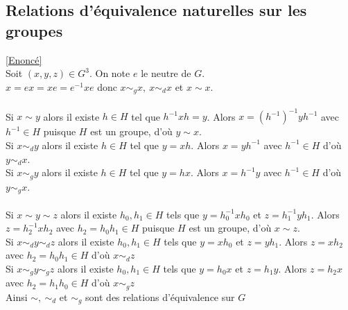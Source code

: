 \documentclass[8pt]{book}
\begin{document}
	\subsection{Relations d'équivalence naturelles sur les groupes }
	\label{Relations d'équivalence naturelles sur les groupes corrigé}
	\textcolor{blue}{\hyperref[Relations d'équivalence naturelles sur les groupes]{[Enoncé]}}\\
	Soit $(x,y,z)\in G^3$. On note $e$ le neutre de $G$.\\
	$x=ex=xe=e^{-1}xe$ donc $x\sim_g x,\ x\sim_d x$ et $x\sim x$.\\\\
	Si $x\sim y$ alors il existe $h\in H$ tel que $h^{-1}xh=y$. Alors $x=\left(h^{-1}\right)^{-1}yh^{-1}$ avec $h^{-1}\in H$ puisque $H$ est un groupe, d'où $y\sim x$.\\
	Si $x\sim_d y$ alors il existe $h\in H$ tel que $y=xh$. Alors $x=yh^{-1}$ avec $h^{-1}\in H$ d'où $y\sim_d x$.\\
	Si $x\sim_g y$ alors il existe $h\in H$ tel que $y=hx$. Alors $x=h^{-1}y$ avec $h^{-1}\in H$ d'où $y\sim_g x$.\\\\
	Si $x\sim y\sim z$ alors il existe $h_0,h_1\in H$ tels que $y=h_0^{-1}xh_0$ et $z=h_1^{-1}yh_1$. Alors $z=h_2^{-1}xh_2$ avec $h_2=h_0h_1\in H$ puisque $H$ est un groupe, d'où $x\sim z$.\\
	Si $x\sim_d y\sim_d z$ alors il existe $h_0,h_1\in H$ tels que $y=xh_0$ et $z=yh_1$. Alors $z=xh_2$ avec $h_2=h_0h_1\in H$ d'où $x\sim_d z$\\
	Si $x\sim_g y\sim_g z$ alors il existe $h_0,h_1\in H$ tels que $y=h_0x$ et $z=h_1y$. Alors $z=h_2x$ avec $h_2=h_1h_0\in H$ d'où $x\sim_g z$\\
	Ainsi $\sim,\ \sim_d$ et $\sim_g$ sont des relations d'équivalence sur $G$  
	
\end{document}
